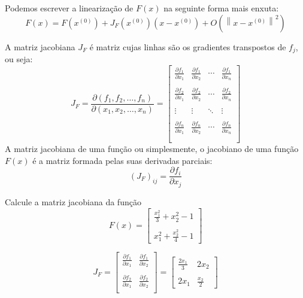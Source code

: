 Podemos escrever a linearização de $F(x)$ na seguinte forma mais enxuta:
$$F(x)=F\left(x^{(0)}\right)+ J_F(x^{(0)})\left(x-x^{(0)}\right) + O\left(\left\|x-x^{(0)}\right\|^2\right) $$

A matriz jacobiana $J_F$ é matriz cujas linhas são os gradientes transpostos de $f_j$, ou seja:
$$J_F= \frac{\partial(f_1,f_2,\ldots,f_n)}{\partial(x_1,x_2,\ldots,x_n)}=\left[
\begin{array}{ccccc}
\frac{\partial f_1}{\partial x_1}&\frac{\partial f_1}{\partial x_2}&\cdots&\frac{\partial f_1}{\partial x_n}\\~\\
\frac{\partial f_2}{\partial x_1}&\frac{\partial f_2}{\partial x_2}&\cdots&\frac{\partial f_2}{\partial x_n}\\~\\
\vdots&\vdots&\ddots&\vdots\\~\\
\frac{\partial f_n}{\partial x_1}&\frac{\partial f_n}{\partial x_2}&\cdots&\frac{\partial f_n}{\partial x_n}\\~\\
\end{array}
\right]
$$
A matriz jacobiana de uma função ou simplesmente, o jacobiano de uma função $F(x)$ é a matriz formada pelas suas derivadas parciais:
$$\left(J_F\right)_{ij}=\frac{\partial f_i}{\partial x_j}$$


\begin{ex} Calcule a matriz jacobiana da função
$$F(x)=\left[
\begin{array}{c}
\frac{x_1^2}{3}+x_2^2-1\\~\\
x_1^2+\frac{x_2^2}{4}-1
\end{array}
\right]$$

$$J_F=\left[
\begin{array}{cc}
\frac{\partial f_1}{\partial x_1} & \frac{\partial f_1}{\partial x_2}\\~\\
\frac{\partial f_2}{\partial x_1} & \frac{\partial f_2}{\partial x_2}\\
\end{array}
\right]=\left[
\begin{array}{cc}
\frac{2x_1}{3} & 2x_2\\~\\
2x_1&\frac{x_2}{2}
\end{array}
\right]
$$
\end{ex}

%
